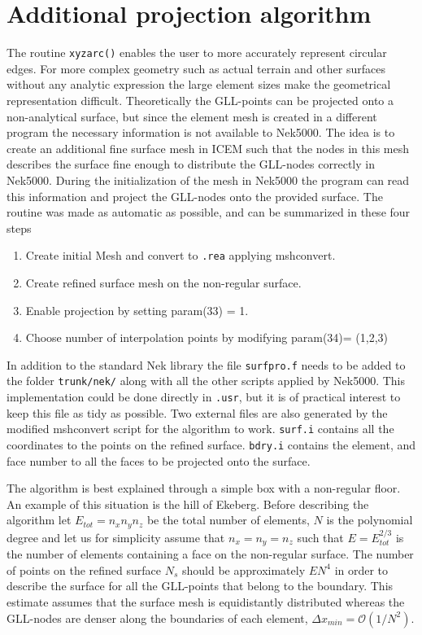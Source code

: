 \section{Additional projection algorithm}\label{surfpro}
The routine \verb|xyzarc()| enables the user to more accurately represent circular edges.
For more complex geometry such as actual terrain and other surfaces without any analytic
expression the large element sizes make the geometrical representation difficult. 
Theoretically the GLL-points can be projected onto a non-analytical surface, but since 
the element mesh is created in a different program the necessary information is not available
to Nek5000. The idea is to create an additional fine surface mesh in ICEM such
that the nodes in this mesh describes the surface fine enough to distribute the GLL-nodes correctly in Nek5000.
During the initialization of the mesh in Nek5000 the program can read this information and project the GLL-nodes onto 
the provided surface. 
The routine was made as automatic as possible, and can be summarized in these four steps
\begin{enumerate}
    \item Create initial Mesh and convert to \verb|.rea| applying mshconvert.
        \item Create refined surface mesh on the non-regular surface.
        \item Enable projection by setting param(33) = 1.
        \item Choose number of interpolation points by modifying param(34)= (1,2,3)
\end{enumerate}

In addition to the standard Nek library the file \verb|surfpro.f| needs to be added to 
the folder \verb|trunk/nek/| along with all the other scripts applied by Nek5000.
This implementation could be done directly in \verb|.usr|, but it is of practical 
interest to keep this file as tidy as possible.
Two external files are also generated by the modified mshconvert script for the algorithm to work.
\verb|surf.i| contains all the coordinates to the points on the refined surface. 
\verb|bdry.i| contains the element, and face number to all the faces to be projected onto the surface.

The algorithm is best explained through a simple box with a non-regular floor. 
An example of this situation is the hill of Ekeberg. 
Before describing the algorithm let $E_{tot} = n_xn_yn_z$  be the total number of elements, 
$N$ is the polynomial degree and let us for simplicity assume that $n_x=n_y=n_z$ such that 
$E= E_{tot}^{2/3}$ is the number of elements containing a face on the non-regular surface.
The number of points on the refined surface $N_s$ should be approximately $EN^4$ in 
order to describe the surface for all the GLL-points that belong to the boundary. This estimate
assumes that the surface mesh is equidistantly distributed whereas the GLL-nodes 
are denser along the boundaries of each element, $\Delta x_{min} = \mathcal{O}(1/N^2)$. 

